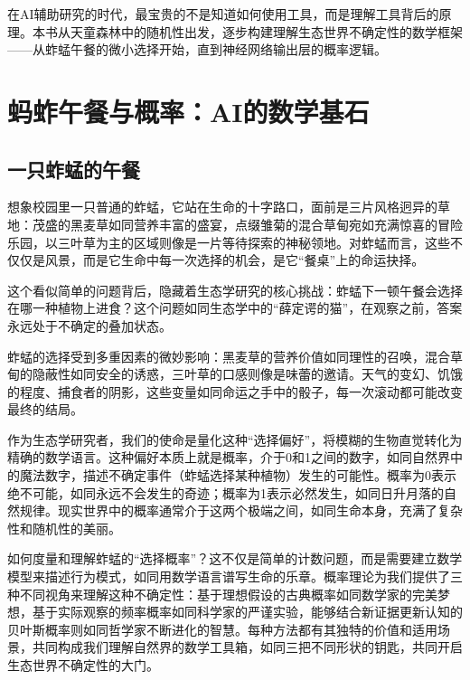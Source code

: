 \documentclass[
  twoside,12pt,fontset=none]{ctexbook}
\begin{document}
在AI辅助研究的时代，最宝贵的不是知道如何使用工具，而是理解工具背后的原理。本书从天童森林中的随机性出发，逐步构建理解生态世界不确定性的数学框架------从蚱蜢午餐的微小选择开始，直到神经网络输出层的概率逻辑。

\hypertarget{ux8682ux86b1ux5348ux9910ux4e0eux6982ux7387aiux7684ux6570ux5b66ux57faux77f3}{%
\section{蚂蚱午餐与概率：AI的数学基石}\label{ux8682ux86b1ux5348ux9910ux4e0eux6982ux7387aiux7684ux6570ux5b66ux57faux77f3}}

\hypertarget{ux4e00ux53eaux86b1ux8722ux7684ux5348ux9910}{%
\subsection{一只蚱蜢的午餐}\label{ux4e00ux53eaux86b1ux8722ux7684ux5348ux9910}}

想象校园里一只普通的蚱蜢，它站在生命的十字路口，面前是三片风格迥异的草地：茂盛的黑麦草如同营养丰富的盛宴，点缀雏菊的混合草甸宛如充满惊喜的冒险乐园，以三叶草为主的区域则像是一片等待探索的神秘领地。对蚱蜢而言，这些不仅仅是风景，而是它生命中每一次选择的机会，是它``餐桌''上的命运抉择。

这个看似简单的问题背后，隐藏着生态学研究的核心挑战：蚱蜢下一顿午餐会选择在哪一种植物上进食？这个问题如同生态学中的``薛定谔的猫''，在观察之前，答案永远处于不确定的叠加状态。

蚱蜢的选择受到多重因素的微妙影响：黑麦草的营养价值如同理性的召唤，混合草甸的隐蔽性如同安全的诱惑，三叶草的口感则像是味蕾的邀请。天气的变幻、饥饿的程度、捕食者的阴影，这些变量如同命运之手中的骰子，每一次滚动都可能改变最终的结局。

作为生态学研究者，我们的使命是量化这种``选择偏好''，将模糊的生物直觉转化为精确的数学语言。这种偏好本质上就是概率，介于0和1之间的数字，如同自然界中的魔法数字，描述不确定事件（蚱蜢选择某种植物）发生的可能性。概率为0表示绝不可能，如同永远不会发生的奇迹；概率为1表示必然发生，如同日升月落的自然规律。现实世界中的概率通常介于这两个极端之间，如同生命本身，充满了复杂性和随机性的美丽。

如何度量和理解蚱蜢的``选择概率''？这不仅是简单的计数问题，而是需要建立数学模型来描述行为模式，如同用数学语言谱写生命的乐章。概率理论为我们提供了三种不同视角来理解这种不确定性：基于理想假设的古典概率如同数学家的完美梦想，基于实际观察的频率概率如同科学家的严谨实验，能够结合新证据更新认知的贝叶斯概率则如同哲学家不断进化的智慧。每种方法都有其独特的价值和适用场景，共同构成我们理解自然界的数学工具箱，如同三把不同形状的钥匙，共同开启生态世界不确定性的大门。
\end{document}
